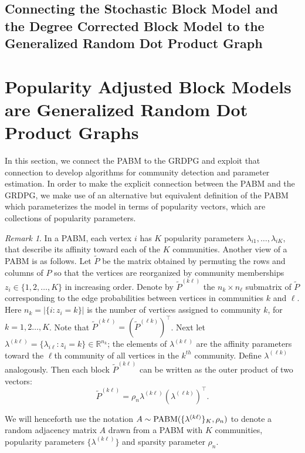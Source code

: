 \documentclass[
  11pt,
]{article}
\theoremstyle{definition}
\theoremstyle{definition}
\theoremstyle{definition}
\theoremstyle{definition}
\theoremstyle{remark}
\newtheorem*{remark}{Remark}
\begin{document}
\hypertarget{sec:sbm-dcbm-grdpg}{%
\subsection{Connecting the Stochastic Block Model and the Degree Corrected Block Model to the Generalized Random Dot Product Graph}\label{sec:sbm-dcbm-grdpg}}

\newpage

\hypertarget{sec:pabm-grdpg}{%
\section{Popularity Adjusted Block Models are Generalized Random Dot Product Graphs}\label{sec:pabm-grdpg}}

In this section, we connect the PABM to the GRDPG and exploit that connection to develop algorithms for community detection and parameter estimation.
In order to make the explicit connection between the PABM and the GRDPG, we make use of an alternative but equivalent definition of the PABM which parameterizes the model in terms of popularity vectors, which are collections of popularity parameters.

\begin{remark}
\label{rem:pabm_view2}
In a PABM, each vertex $i$ has $K$ popularity parameters $\lambda_{i1}, \dots, \lambda_{iK}$, that describe its affinity toward each of the $K$ communities. 
Another view of a PABM is as follows.
Let $\tilde{P}$ be the matrix obtained by permuting the rows and columns of $P$ so that the vertices are reorganized by community memberships $z_i \in \{1,2,\dots,K\}$ in increasing order. 
Denote by $\tilde{P}^{(k \ell)}$ the $n_k \times n_{\ell}$ submatrix of $\tilde{P}$ corresponding to the edge probabilities between vertices in communities $k$ and $\ell$. 
Here $n_k = |\{ i \colon z_i = k\}|$ is the number of vertices assigned to community $k$, for $k = 1,2\dots,K$.
Note that $\tilde{P}^{(k \ell)} = (\tilde{P}^{(\ell k)})^\top$. 
Next let $\lambda^{(k \ell)} = \{\lambda_{i \ell} \colon z_i = k\} \in \mathbb{R}^{n_k}$; the elements of $\lambda^{(k \ell)}$ are the affinity parameters toward the $\ell$th community of all vertices in the $k^{th}$ community. 
Define $\lambda^{(\ell k)}$ analogously. 
Then each block $\tilde{P}^{(k \ell)}$ can be written as the outer product of two vectors:
\begin{equation} \label{eq:pabm}
  \tilde{P}^{(k \ell)} = \rho_n \lambda^{(k \ell)} (\lambda^{(\ell k)})^{\top}.
\end{equation} 

We will henceforth use the notation \(A \sim \mathrm{PABM}(\{\lambda^{(k \ell)}\}_K, \rho_n)\) to denote a random adjacency matrix \(A\) drawn from a PABM with $K$ communities, popularity parameters \(\{\lambda^{(k \ell)}\}\) and sparsity parameter $\rho_n$.
\end{remark}
\end{document}
